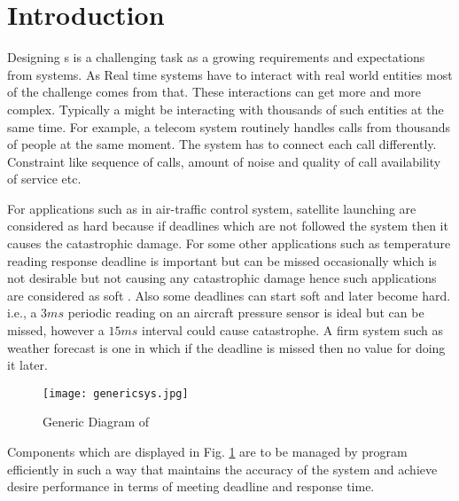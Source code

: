 \section{Introduction}\label{sec:introduction}
Designing \rts s is a challenging task as a growing requirements and expectations from systems. As Real time systems have to interact with real world entities most of the challenge comes from that. These interactions can get more and more complex. Typically a \rts might be interacting with thousands of such entities at the same time. For example, a telecom system routinely handles calls from thousands of people at the same moment. The system has to connect each call differently. Constraint like sequence of calls, amount of noise and quality of call availability of service etc.

For applications such as in air-traffic control system, satellite launching are considered as hard \rts because if deadlines which are not followed the system then it causes the catastrophic damage. For some other applications such as temperature reading response deadline is important but can be missed occasionally which is not desirable but not causing any catastrophic damage hence such applications are considered as soft \rts. Also some deadlines can start soft and later become hard. i.e., a $ 3 ms $ periodic reading on an aircraft pressure sensor is ideal but can be missed, however a $ 15 ms $ interval could cause catastrophe. A firm system such as weather forecast is one in which if the deadline is missed then no value for doing it later.

\begin{figure}[!htbp]
    \centering
    \texttt{[image: genericsys.jpg]}
    \caption{Generic Diagram of \rts\cite{realTimeIssues}}\label{fig:generic-rts}
\end{figure}

Components which are displayed in Fig. \ref{fig:generic-rts} are to be managed by program efficiently in such a way that maintains the accuracy of the system and achieve desire performance in terms of meeting deadline and response time.
